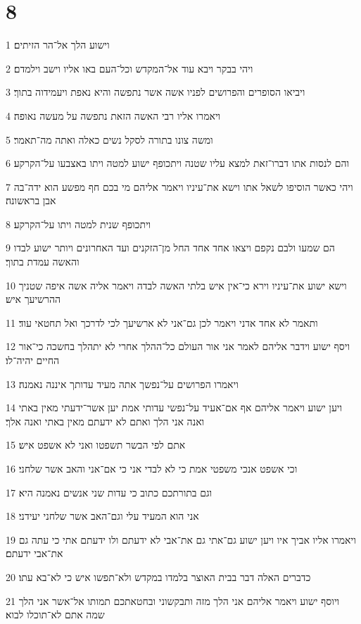 \chapter{8}

\par 1 וישוע הלך אל־הר הזיתים׃
\par 2 ויהי בבקר ויבא עוד אל־המקדש וכל־העם באו אליו וישב וילמדם׃
\par 3 ויביאו הסופרים והפרושים לפניו אשה אשר נתפשה והיא נאפת ויעמידוה בתוך׃
\par 4 ויאמרו אליו רבי האשה הזאת נתפשה על מעשה נאופה׃
\par 5 ומשה צונו בתורה לסקל נשים כאלה ואתה מה־תאמר׃
\par 6 והם לנסות אתו דברו־זאת למצא עליו שטנה ויתכופף ישוע למטה ויתו באצבעו על־הקרקע׃
\par 7 ויהי כאשר הוסיפו לשאל אתו וישא את־עיניו ויאמר אליהם מי בכם חף מפשע הוא ידה־בה אבן בראשונה׃
\par 8 ויתכופף שנית למטה ויתו על־הקרקע׃
\par 9 הם שמעו ולבם נקפם ויצאו אחד אחד החל מן־הזקנים ועד האחרונים ויותר ישוע לבדו והאשה עמדת בתוך׃
\par 10 וישא ישוע את־עיניו וירא כי־אין איש בלתי האשה לבדה ויאמר אליה אשה איפה שטניך ההרשיעך איש׃
\par 11 ותאמר לא אחד אדני ויאמר לכן גם־אני לא ארשיעך לכי לדרכך ואל תחטאי עוד׃
\par 12 ויסף ישוע וידבר אליהם לאמר אני אור העולם כל־ההלך אחרי לא יתהלך בחשכה כי־אור החיים יהיה־לו׃
\par 13 ויאמרו הפרושים על־נפשך אתה מעיד עדותך איננה נאמנה׃
\par 14 ויען ישוע ויאמר אליהם אף אם־אעיד על־נפשי עדותי אמת יען אשר־ידעתי מאין באתי ואנה אני הלך ואתם לא ידעתם מאין באתי ואנה אלך׃
\par 15 אתם לפי הבשר תשפטו ואני לא אשפט איש׃
\par 16 וכי אשפט אנכי משפטי אמת כי לא לבדי אני כי אם־אני והאב אשר שלחני׃
\par 17 וגם בתורתכם כתוב כי עדות שני אנשים נאמנה היא׃
\par 18 אני הוא המעיד עלי וגם־האב אשר שלחני יעידני׃
\par 19 ויאמרו אליו אביך איו ויען ישוע גם־אתי גם את־אבי לא ידעתם ולו ידעתם אתי כי עתה גם את־אבי ידעתם׃
\par 20 כדברים האלה דבר בבית האוצר בלמדו במקדש ולא־תפשו איש כי לא־בא עתו׃
\par 21 ויוסף ישוע ויאמר אליהם אני הלך מזה ותבקשוני ובחטאתכם תמותו אל־אשר אני הלך שמה אתם לא־תוכלו לבוא׃
